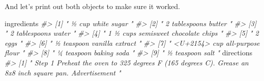 \documentclass[
  12pt,
]{book}
\newenvironment{Shaded}{\begin{snugshade}}{\end{snugshade}}
\newcommand{\CommentTok}[1]{\textcolor[rgb]{0.37,0.37,0.37}{\textit{#1}}}
\newcommand{\NormalTok}[1]{#1}
\begin{document}
And let's print out both objects to make sure it worked.

\begin{Shaded}
\begin{Highlighting}[]
\NormalTok{ingredients}
\CommentTok{\#\textgreater{} [1] "                                                ½ cup white sugar                                             "                 }
\CommentTok{\#\textgreater{} [2] "                                                2 tablespoons butter                                             "              }
\CommentTok{\#\textgreater{} [3] "                                                2 tablespoons water                                             "               }
\CommentTok{\#\textgreater{} [4] "                                                1 ½ cups semisweet chocolate chips                                             "}
\CommentTok{\#\textgreater{} [5] "                                                2  eggs                                             "                           }
\CommentTok{\#\textgreater{} [6] "                                                ½ teaspoon vanilla extract                                             "        }
\CommentTok{\#\textgreater{} [7] "                                                \textless{}U+2154\textgreater{} cup all{-}purpose flour                                             "    }
\CommentTok{\#\textgreater{} [8] "                                                ¼ teaspoon baking soda                                             "            }
\CommentTok{\#\textgreater{} [9] "                                                ½ teaspoon salt                                             "}
\NormalTok{directions}
\CommentTok{\#\textgreater{} [1] "                                                                                                                                                            Step 1                                                                                                                                                                                                                                          Preheat the oven to 325 degrees F (165 degrees C). Grease an 8x8 inch square pan.                                                                                                                                                                                                                                                                                      Advertisement                                  "                                                   }

\end{Highlighting}
\end{Shaded}
\end{document}
